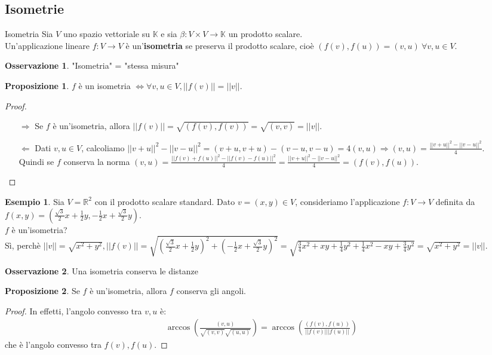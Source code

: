 \documentclass[a4paper]{article}
\theoremstyle{definition}
\newtheorem*{oss}{Osservazione}
\newtheorem*{es}{Esempio}
\newtheorem*{prop}{Proposizione}
\begin{document}
	\subsection{Isometrie}
	\begin{deff}{Isometria}{}
		Sia $V$ uno spazio vettoriale su $\mathbb{K}$ e sia $\beta: V \times V \to \mathbb{K}$ un prodotto scalare. \\
		Un'applicazione lineare $f: V \to V$ è un'\textbf{isometria} se preserva il prodotto scalare, cioè $(f(v), f(u)) = (v, u) \ \forall v, u \in V$.
	\end{deff}
	\begin{oss}
		"Isometria" = "stessa misura"
	\end{oss}
	\begin{prop}
		$f$ è un isometria $\Leftrightarrow \forall v, u \in V, ||f(v)|| = ||v||$.
	\end{prop}
	\begin{proof}
		\begin{itemize}
			\item[$\Rightarrow$] Se $f$ è un'isometria, allora $||f(v)|| = \sqrt{(f(v), f(v))} = \sqrt{(v, v)} = ||v||$.
			\item[$\Leftarrow$] Dati $v, u \in V$, calcoliamo $||v + u||^2 - ||v - u||^2 = (v + u, v + u) - (v - u, v - u) = 4(v, u) \Rightarrow (v, u) = \frac{||v + u||^2 - ||v - u||^2}{4}$. \\
			Quindi se $f$ conserva la norma $(v, u) = \frac{||f(v) + f(u)||^2 - ||f(v) - f(u)||^2}{4} = \frac{||v + u||^2 - ||v - u||^2}{4} = (f(v), f(u))$.
		\end{itemize}
	\end{proof}

	\begin{es}
		Sia $V = \mathbb{R}^2$ con il prodotto scalare standard. Dato $v = (x, y) \in V$, consideriamo l'applicazione $f: V \to V$ definita da $f(x, y) = (\frac{\sqrt{3}}{2}x + \frac{1}{2}y, -\frac{1}{2}x + \frac{\sqrt{3}}{2}y)$. \\
		$f$ è un'isometria? \\
		Sì, perchè $||v|| = \sqrt{x^2 + y^2},
		||f(v)|| = \sqrt{(\frac{\sqrt{3}}{2}x + \frac{1}{2}y)^2 + (-\frac{1}{2}x + \frac{\sqrt{3}}{2}y)^2} = \sqrt{\frac{3}{4}x^2 + xy + \frac{1}{4}y^2 + \frac{1}{4}x^2 - xy + \frac{3}{4}y^2} = \sqrt{x^2 + y^2} = ||v||$.
	\end{es}

	\begin{oss}
		Una isometria conserva le distanze
	\end{oss}
	\begin{prop}
		Se $f$ è un'isometria, allora $f$ conserva gli angoli.
	\end{prop}
	\begin{proof}
		In effetti, l'angolo convesso tra $v, u$ è:
		\begin{align*}
			\arccos\left(\frac{(v, u)}{\sqrt{(v, v)}\sqrt{(u, u)}}\right) = \arccos\left(\frac{(f(v), f(u))}{||f(v)|||f(u)||}\right)
		\end{align*}
		che è l'angolo convesso tra $f(v), f(u)$.
	\end{proof}
\end{document}
